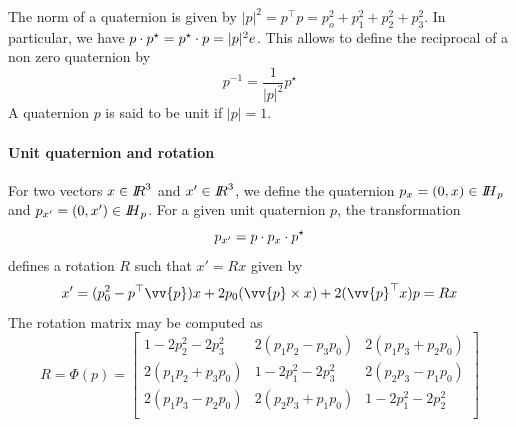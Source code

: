 The norm of a quaternion is given by $|p|^2=p^\top p = p_o^2+p_1^2+p_2^2+p_3^2$. In particular, we have $p \cdot p^\star = p^\star \cdot p = |p|^2 e$. This allows to define the reciprocal of a non zero quaternion by
\begin{equation}
  \label{eq:78}
  p ^{-1} = \frac 1 {|p|^2} p^\star
\end{equation}
A quaternion $p$ is said to be unit if $|p| =1$.

\paragraph{Unit quaternion and rotation}
For two vectors $x\in \mbox{\rm $I\!\!R$}^3$ and $x'\in \mbox{\rm $I\!\!R$}^3$, we define the quaternion $p_x = (0,x)\in \mbox{\rm $I\!\!H$}_p$ and  $p_{x'} = (0,x')\in \mbox{\rm $I\!\!H$}_p$.
For a given unit quaternion $p$, the transformation
\begin{equation}
  \label{eq:79}
  p_{x'} = p \cdot p_x \cdot  p^\star
\end{equation}
defines a rotation $R$ such that $x'  = R x$ given by
\begin{equation}
  \label{eq:80}
  x' = (p_0^2- p^\top \vv{p}) x +2 p_0(\vv{p}\times x) +  2 (\vv{p}^\top x) p = R x
\end{equation}
The rotation matrix may be computed as
\begin{equation}
  \label{eq:81}
  R = \Phi(p) =
  \begin{bmatrix}
    1-2 p_2^2- 2 p_3^2 & 2(p_1p_2-p_3p_0) & 2(p_1p_3+p_2p_0)\\
    2(p_1p_2+p_3p_0) & 1-2 p_1^2- 2 p_3^2 & 2(p_2p_3-p_1p_0)\\
    2(p_1p_3-p_2p_0) & 2(p_2p_3+p_1p_0)  & 1-2 p_1^2- 2 p_2^2\\
  \end{bmatrix}
\end{equation}


